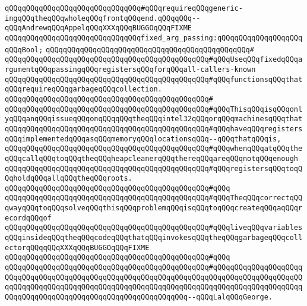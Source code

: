 \verb|qQQqqQQqqQQqqQQqqQQqqQQqqQQqqQQq#qQQqrequireqQQqgeneric-ingqQQqtheqQQqwholeqQQqfrontqQQqend.qQQqqQQq--qQQqAndrewqQQqAppelqQQqXXXqQQqBUGGOqQQqFIXME|\newline
\newline
\verb|qQQqqQQqqQQqqQQqqQQqqQQqqQQqqQQqfixed_arg_passing:qQQqqQQqqQQqqQQqqQQqqQQqBool;|\newline
\verb|qQQqqQQqqQQqqQQqqQQqqQQqqQQqqQQqqQQqqQQqqQQqqQQq#|\newline
\verb|qQQqqQQqqQQqqQQqqQQqqQQqqQQqqQQqqQQqqQQqqQQqqQQq#qQQqUseqQQqfixedqQQqargumentqQQqpassingqQQqregistersqQQqforqQQqall-callers-known|\newline
\verb|qQQqqQQqqQQqqQQqqQQqqQQqqQQqqQQqqQQqqQQqqQQqqQQq#qQQqfunctionsqQQqthatqQQqrequireqQQqgarbageqQQqcollection.|\newline
\verb|qQQqqQQqqQQqqQQqqQQqqQQqqQQqqQQqqQQqqQQqqQQqqQQq#|\newline
\verb|qQQqqQQqqQQqqQQqqQQqqQQqqQQqqQQqqQQqqQQqqQQqqQQq#qQQqThisqQQqisqQQqonlyqQQqanqQQqissueqQQqonqQQqqQQqtheqQQqintel32qQQqorqQQqmachinesqQQqthat|\newline
\verb|qQQqqQQqqQQqqQQqqQQqqQQqqQQqqQQqqQQqqQQqqQQqqQQq#qQQqhaveqQQqregistersqQQqimplementedqQQqasqQQqmemoryqQQqlocationsqQQq--qQQqthatqQQqis,|\newline
\verb|qQQqqQQqqQQqqQQqqQQqqQQqqQQqqQQqqQQqqQQqqQQqqQQq#qQQqwhenqQQqatqQQqtheqQQqcallqQQqtoqQQqtheqQQqheapcleanerqQQqthereqQQqareqQQqnotqQQqenough|\newline
\verb|qQQqqQQqqQQqqQQqqQQqqQQqqQQqqQQqqQQqqQQqqQQqqQQq#qQQqregistersqQQqtoqQQqholdqQQqallqQQqtheqQQqroots.|\newline
\verb|qQQqqQQqqQQqqQQqqQQqqQQqqQQqqQQqqQQqqQQqqQQqqQQq#qQQq|\newline
\verb|qQQqqQQqqQQqqQQqqQQqqQQqqQQqqQQqqQQqqQQqqQQqqQQq#qQQqTheqQQqcorrectqQQqwayqQQqtoqQQqsolveqQQqthisqQQqproblemqQQqisqQQqtoqQQqcreateqQQqaqQQqrecordqQQqof|\newline
\verb|qQQqqQQqqQQqqQQqqQQqqQQqqQQqqQQqqQQqqQQqqQQqqQQq#qQQqliveqQQqvariablesqQQqinsideqQQqtheqQQqcodeqQQqthatqQQqinvokesqQQqtheqQQqgarbageqQQqcollectorqQQqqQQqXXXqQQqBUGGOqQQqFIXME|\newline
\verb|qQQqqQQqqQQqqQQqqQQqqQQqqQQqqQQqqQQqqQQqqQQqqQQq#qQQq|\newline
\verb|qQQqqQQqqQQqqQQqqQQqqQQqqQQqqQQqqQQqqQQqqQQqqQQq#qQQqqQQqqQQqqQQqqQQqqQQqqQQqqQQqqQQqqQQqqQQqqQQqqQQqqQQqqQQqqQQqqQQqqQQqqQQqqQQqqQQqqQQqqQQqqQQqqQQqqQQqqQQqqQQqqQQqqQQqqQQqqQQqqQQqqQQqqQQqqQQqqQQqqQQqqQQqqQQqqQQqqQQqqQQqqQQqqQQqqQQqqQQqqQQqqQQqqQQqqQQq--qQQqLalqQQqGeorge.|\newline
